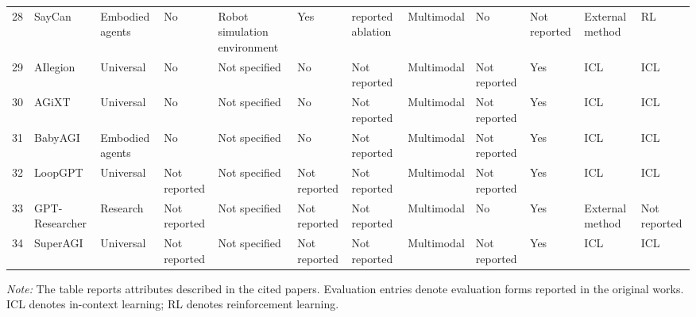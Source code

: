 \begin{table}
{\begin{tabular}{rlllllllllll}
28&SayCan\cite{saycan2022arxiv}&Embodied agents&No&Robot simulation environment&Yes&reported ablation&Multimodal&No&Not reported&External method&RL\\
29&AIlegion\cite{ailegion2023}&Universal&No&{Not specified}&No&Not reported&Multimodal&Not reported&Yes&ICL&ICL\\
30&AGiXT\cite{agixt2023}&Universal&No&{Not specified}&No&Not reported&Multimodal&Not reported&Yes&ICL&ICL\\
31&BabyAGI\cite{babyagi2023}&Embodied agents&No&{Not specified}&No&Not reported&Multimodal&Not reported&Yes&ICL&ICL\\
32&LoopGPT\cite{loopgpt2023}&Universal&Not reported&Not specified&Not reported&Not reported&Multimodal&Not reported&Yes&ICL&ICL\\
33&GPT-Researcher\cite{gptresearcher2023}&Research&Not reported&Not specified&Not reported&Not reported&Multimodal&No&Yes&External method&Not reported\\
34&SuperAGI\cite{superagi2023}&Universal&Not reported&Not specified&Not reported&Not reported&Multimodal&Not reported&Yes&ICL&ICL\\

\bottomrule
\end{tabular}
}
\vspace{2pt}
\footnotesize{\emph{Note:} The table reports attributes described in the cited papers. Evaluation entries denote evaluation forms reported in the original works. ICL denotes in-context learning; RL denotes reinforcement learning.}

\end{table}
